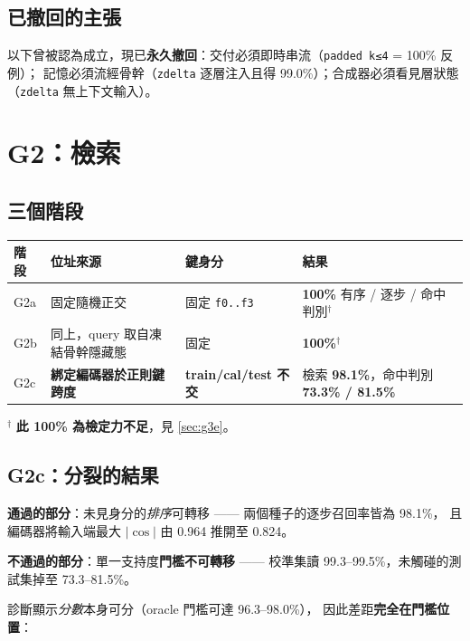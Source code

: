 \documentclass[11pt, a4paper]{article}
\begin{document}
\subsection{已撤回的主張}

以下曾被認為成立，現已\textbf{永久撤回}：交付必須即時串流（\verb|padded k≤4| = 100\% 反例）；
記憶必須流經骨幹（\verb|zdelta| 逐層注入且得 99.0\%）；合成器必須看見層狀態
（\verb|zdelta| 無上下文輸入）。

\section{G2：檢索}

\subsection{三個階段}

\begin{table}[h]
\centering
\small
\begin{tabular}{llll}
\toprule
階段 & 位址來源 & 鍵身分 & 結果 \\
\midrule
G2a & 固定隨機正交 & 固定 \verb|f0..f3| & \textbf{100\%} 有序 / 逐步 / 命中判別$^\dagger$ \\
G2b & 同上，query 取自凍結骨幹隱藏態 & 固定 & \textbf{100\%}$^\dagger$ \\
G2c & \textbf{綁定編碼器於正則鍵跨度} & \textbf{train/cal/test 不交} & 檢索 \textbf{98.1\%}，命中判別 \textbf{73.3\% / 81.5\%} \\
\bottomrule
\end{tabular}
\end{table}

$^\dagger$ \textbf{此 100\% 為檢定力不足}，見 \autoref{sec:g3e}。

\subsection{G2c：分裂的結果}\label{sec:g2c}

\textbf{通過的部分}：未見身分的\emph{排序}可轉移 —— 兩個種子的逐步召回率皆為 98.1\%，
且編碼器將輸入端最大 $|\cos|$ 由 0.964 推開至 0.824。

\textbf{不通過的部分}：單一支持度\textbf{門檻不可轉移} ——
校準集讀 99.3--99.5\%，未觸碰的測試集掉至 73.3--81.5\%。

診斷顯示\emph{分數}本身可分（oracle 門檻可達 96.3--98.0\%），
因此差距\textbf{完全在門檻位置}：
\end{document}
